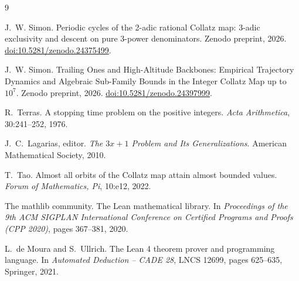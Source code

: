 \documentclass[11pt,a4paper]{article}
\begin{document}
\begin{thebibliography}{9}

 J.~W. Simon.
\newblock Periodic cycles of the 2-adic rational Collatz map: 3-adic exclusivity
  and descent on pure 3-power denominators.
\newblock Zenodo preprint, 2026.
\newblock \href{https://doi.org/10.5281/zenodo.24375499}{doi:10.5281/zenodo.24375499}.

 J.~W. Simon.
\newblock Trailing Ones and High-Altitude Backbones: Empirical Trajectory
  Dynamics and Algebraic Sub-Family Bounds in the Integer Collatz Map up to
  $10^{7}$.
\newblock Zenodo preprint, 2026.
\newblock \href{https://doi.org/10.5281/zenodo.24397999}{doi:10.5281/zenodo.24397999}.

 R.~Terras.
\newblock A stopping time problem on the positive integers.
\newblock \emph{Acta Arithmetica}, 30:241--252, 1976.

 J.~C.~Lagarias, editor.
\newblock \emph{The $3x+1$ Problem and Its Generalizations}.
\newblock American Mathematical Society, 2010.

 T.~Tao.
\newblock Almost all orbits of the Collatz map attain almost bounded values.
\newblock \emph{Forum of Mathematics, Pi}, 10:e12, 2022.

 The mathlib community.
\newblock The Lean mathematical library.
\newblock In \emph{Proceedings of the 9th ACM SIGPLAN International Conference on
  Certified Programs and Proofs (CPP 2020)}, pages 367--381, 2020.

 L.~de Moura and S.~Ullrich.
\newblock The Lean 4 theorem prover and programming language.
\newblock In \emph{Automated Deduction -- CADE 28}, LNCS 12699, pages 625--635,
  Springer, 2021.

\end{thebibliography}
\end{document}
